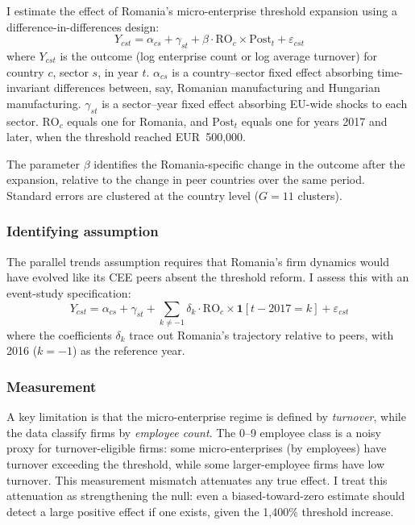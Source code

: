 \documentclass[12pt]{article}
\begin{document}
I estimate the effect of Romania's micro-enterprise threshold expansion using a difference-in-differences design:
\begin{equation}
Y_{cst} = \alpha_{cs} + \gamma_{st} + \beta \cdot \text{RO}_c \times \text{Post}_t + \varepsilon_{cst}
\label{eq:did}
\end{equation}
where $Y_{cst}$ is the outcome (log enterprise count or log average turnover) for country $c$, sector $s$, in year $t$. $\alpha_{cs}$ is a country--sector fixed effect absorbing time-invariant differences between, say, Romanian manufacturing and Hungarian manufacturing. $\gamma_{st}$ is a sector--year fixed effect absorbing EU-wide shocks to each sector. $\text{RO}_c$ equals one for Romania, and $\text{Post}_t$ equals one for years 2017 and later, when the threshold reached EUR~500,000.

The parameter $\beta$ identifies the Romania-specific change in the outcome after the expansion, relative to the change in peer countries over the same period. Standard errors are clustered at the country level ($G = 11$ clusters).

\subsubsection*{Identifying assumption} The parallel trends assumption requires that Romania's firm dynamics would have evolved like its CEE peers absent the threshold reform. I assess this with an event-study specification:
\begin{equation}
Y_{cst} = \alpha_{cs} + \gamma_{st} + \sum_{k \neq -1} \delta_k \cdot \text{RO}_c \times \mathbf{1}[t - 2017 = k] + \varepsilon_{cst}
\end{equation}
where the coefficients $\delta_k$ trace out Romania's trajectory relative to peers, with 2016 ($k = -1$) as the reference year.

\subsubsection*{Measurement} A key limitation is that the micro-enterprise regime is defined by \textit{turnover}, while the data classify firms by \textit{employee count}. The 0--9 employee class is a noisy proxy for turnover-eligible firms: some micro-enterprises (by employees) have turnover exceeding the threshold, while some larger-employee firms have low turnover. This measurement mismatch attenuates any true effect. I treat this attenuation as strengthening the null: even a biased-toward-zero estimate should detect a large positive effect if one exists, given the 1,400\% threshold increase.
\end{document}

